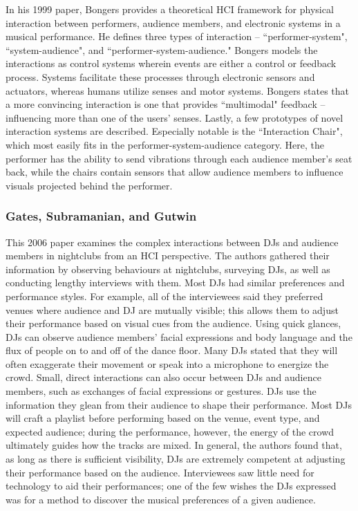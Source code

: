 In his 1999 paper, Bongers provides a theoretical HCI framework for physical interaction between performers, audience members, and electronic systems in a musical performance. He defines three types of interaction -- ``performer-system", ``system-audience", and ``performer-system-audience." Bongers models the interactions as control systems wherein events are either a control or feedback process. Systems facilitate these processes through electronic sensors and actuators, whereas humans utilize senses and motor systems. Bongers states that a more convincing interaction is one that provides ``multimodal" feedback -- influencing more than one of the users' senses. Lastly, a few prototypes of novel interaction systems are described. Especially notable is the ``Interaction Chair", which most easily fits in the performer-system-audience category. Here, the performer has the ability to send vibrations through each audience member's seat back, while the chairs contain sensors that allow audience members to influence visuals projected behind the performer.

\subsubsection{Gates, Subramanian, and Gutwin}

This 2006 paper examines the complex interactions between DJs and audience members in nightclubs from an HCI perspective. The authors gathered their information by observing behaviours at nightclubs, surveying DJs, as well as conducting lengthy interviews with them. Most DJs had similar preferences and performance styles. For example, all of the interviewees said they preferred venues where audience and DJ are mutually visible; this allows them to adjust their performance based on visual cues from the audience. Using quick glances, DJs can observe audience members' facial expressions and body language and the flux of people on to and off of the dance floor. Many DJs stated that they will often exaggerate their movement or speak into a microphone to energize the crowd. Small, direct interactions can also occur between DJs and audience members, such as exchanges of facial expressions or gestures. DJs use the information they glean from their audience to shape their performance. Most DJs will craft a playlist before performing based on the venue, event type, and expected audience; during the performance, however, the energy of the crowd ultimately guides how the tracks are mixed. In general, the authors found that, as long as there is sufficient visibility, DJs are extremely competent at adjusting their performance based on the audience. Interviewees saw little need for technology to aid their performances; one of the few wishes the DJs expressed was for a method to discover the musical preferences of a given audience.

